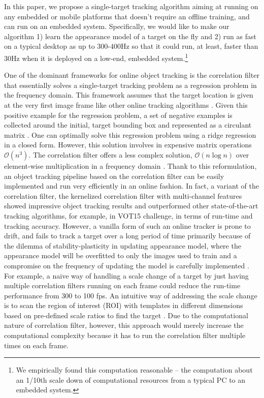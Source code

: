 \documentclass{bmvc2k}
\begin{document}
In this paper, we propose a single-target tracking algorithm aiming at
running on any embedded or mobile platforms that doesn't require an
offline training, and can run on an embedded system. Specifically, we
would like to make our algorithm 1) learn the appearance model of a
target on the fly and 2) run as fast on a typical desktop as up to
$300$-$400$Hz so that it could run, at least, faster than 30Hz when it
is deployed on a low-end, embedded system.\footnote{We empirically
  found this computation reasonable -- the computation about an 1/10th
  scale down of computational resources from a typical PC to an
  embedded system.}

One of the dominant frameworks for online object tracking is the
correlation filter that essentially solves a single-target tracking
problem as a regression problem in the frequency domain. This
framework assumes that the target location is given at the very first
image frame like other online tracking algorithms
\cite{smeulders2014survey}. Given this positive example for the
regression problem, a set of negative examples is collected around the
initial, target bounding box and represented as a circulant matrix
\cite{henriques2015high}. One can optimally solve this regression
problem using a ridge regression in a closed form. However, this
solution involves in expensive matrix operations
$\mathcal{O}(n^{3})$. The correlation filter offers a less complex
solution, $\mathcal{O}(n\log n)$ over element-wise multiplication in a
frequency domain \cite{bolme2010visual,henriques2015high}. Thank to
this reformulation, an object tracking pipeline based on the
correlation filter can be easily implemented and run very efficiently
in an online fashion. In fact, a variant of the correlation filter,
the kernelized correlation filter with multi-channel features
\cite{henriques2015high} showed impressive object tracking results and
outperformed other state-of-the-art tracking algorithms, for example,
in VOT15 challenge, in terms of run-time and tracking
accuracy. However, a vanilla form of such an online tracker is prone
to drift, and fails to track a target over a long period of time
primarily \cite{henriques2015high} because of the dilemma of
stability-plasticity in updating appearance model, where the
appearance model will be overfitted to only the images used to train
and a compromise on the frequency of updating the model is carefully
implemented \cite{santner2010prost}. For example, a naive way of
handling a scale change of a target by just having multiple
correlation filters running on each frame could reduce the run-time
performance from 300 to 100 fps. An intuitive way of addressing the
scale change is to scan the region of interest (ROI) with templates in
different dimensions based on pre-defined scale ratios to find the
target
\cite{henriques2015high,tang2015multi,ma2015long,bibi2015multi,li2014scale}. Due
to the computational nature of correlation filter, however, this
approach would merely increase the computational complexity because it
has to run the correlation filter multiple times on each frame.
\end{document}
